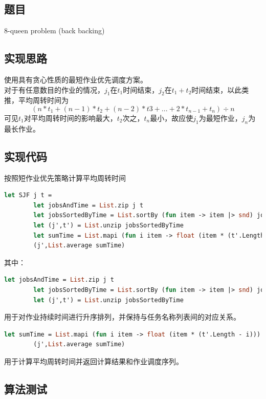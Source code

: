 \documentclass[a4paper]{article}
\begin{document}
\subsection{题目}

8-queen problem (back backing)

\subsection{实现思路}

使用具有贪心性质的最短作业优先调度方案。\\
对于有任意数目的作业的情况，\(j_1\)在\(t_1\)时间结束，\(j_2\)在\(t_1+t_2\)时间结束，以此类推，平均周转时间为 \[(n*t_1+(n-1)*t_2+(n-2)*t3+...+2*t_{n-1}+t_n) \div n\]
可见\(t_1\)对平均周转时间的影响最大，\(t_2\)次之，\(t_n\)最小，故应使\(j_1\)为最短作业，\(j_n\)为最长作业。
\subsection{实现代码}

按照短作业优先策略计算平均周转时间

\begin{lstlisting}[language=ML]
    let SJF j t =
        let jobsAndTime = List.zip j t
        let jobsSortedByTime = List.sortBy (fun item -> item |> snd) jobsAndTime
        let (j',t') = List.unzip jobsSortedByTime
        let sumTime = List.mapi (fun i item -> float (item * (t'.Length - i))) t'
        (j',List.average sumTime)
\end{lstlisting}

其中：\\

\begin{lstlisting}[language=ML]
        let jobsAndTime = List.zip j t
        let jobsSortedByTime = List.sortBy (fun item -> item |> snd) jobsAndTime
        let (j',t') = List.unzip jobsSortedByTime
\end{lstlisting}
用于对作业持续时间进行升序排列，并保持与任务名称列表间的对应关系。

\begin{lstlisting}[language=ML]
        let sumTime = List.mapi (fun i item -> float (item * (t'.Length - i))) t'
        (j',List.average sumTime)
\end{lstlisting}

用于计算平均周转时间并返回计算结果和作业调度序列。

\subsection{算法测试}
\end{document}
